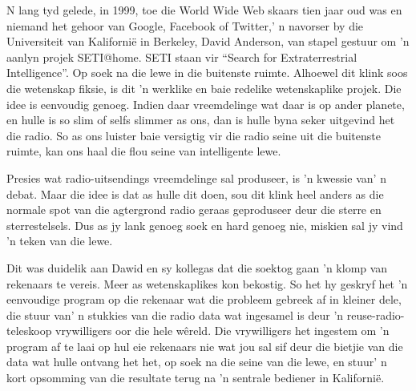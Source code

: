 % 
% 
% 
N lang tyd gelede, in 1999, toe die World Wide Web skaars tien jaar oud was en niemand het gehoor van Google, Facebook of Twitter,' n navorser by die Universiteit van Kalifornië in Berkeley, David Anderson, van stapel gestuur om 'n aanlyn projek SETI@home. SETI staan vir “Search for Extraterrestrial Intelligence”. Op soek na die lewe in die buitenste ruimte. 
Alhoewel dit klink soos die wetenskap fiksie, is dit 'n werklike en baie redelike wetenskaplike projek. Die idee is eenvoudig genoeg. Indien daar vreemdelinge wat daar is op ander planete, en hulle is so slim of selfs slimmer as ons, dan is hulle byna seker uitgevind het die radio. So as ons luister baie versigtig vir die radio seine uit die buitenste ruimte, kan ons haal die flou seine van intelligente lewe. \par
Presies wat radio-uitsendings vreemdelinge sal produseer, is 'n kwessie van' n debat. Maar die idee is dat as hulle dit doen, sou dit klink heel anders as die normale spot van die agtergrond radio geraas geproduseer deur die sterre en sterrestelsels. Dus as jy lank genoeg soek en hard genoeg nie, miskien sal jy vind 'n teken van die lewe. \par
Dit was duidelik aan Dawid en sy kollegas dat die soektog gaan 'n klomp van rekenaars te vereis. Meer as wetenskaplikes kon bekostig. So het hy geskryf het 'n eenvoudige program op die rekenaar wat die probleem gebreek af in kleiner dele, die stuur van' n stukkies van die radio data wat ingesamel is deur 'n reuse-radio-teleskoop vrywilligers oor die hele wêreld. Die vrywilligers het ingestem om 'n program af te laai op hul eie rekenaars nie wat jou sal sif deur die bietjie van die data wat hulle ontvang het het, op soek na die seine van die lewe, en stuur' n kort opsomming van die resultate terug na 'n sentrale bediener in Kalifornië. \par
